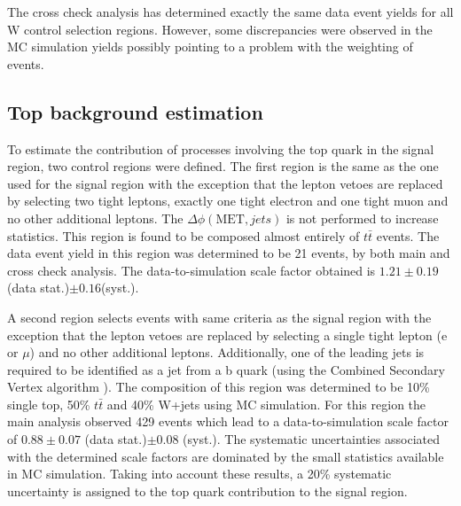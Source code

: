 The cross check analysis has determined exactly the same data event yields for all W control selection regions. However, some discrepancies were observed in the \gls{MC} simulation yields possibly pointing to a problem with the weighting of events.

\clearpage

\subsection{Top background estimation}
\label{SECTION:ParkedDataAnalysis_ControlRegions_TopBackground}


To estimate the contribution of processes involving the top quark in the signal region, two control regions were defined. The first region is the same as the one used for the signal region with the exception that the lepton vetoes are replaced by selecting two tight leptons, exactly one tight electron and one tight muon and no other additional leptons. The $\Delta\phi(\text{MET},jets)$ is not performed to increase statistics.  This region is found to be composed almost entirely of $t\bar{t}$ events. The data event yield in this region was determined to be 21 events, by both main and cross check analysis. The data-to-simulation scale factor obtained is $1.21\pm 0.19$ (data stat.)$ \pm 0.16 $(syst.).

A second region selects events with same criteria as the signal region with the exception that the lepton vetoes are replaced by selecting a single tight lepton (e or $\mu$) and no other additional leptons. Additionally, one of the leading jets is required to be identified as a jet from a b quark (using the Combined Secondary Vertex algorithm \cite{ARTICLE:CMSIdentificationOfbQuarks}). The composition of this region was determined to be 10\% single top, 50\% $t\bar{t}$ and 40\% W+jets using \gls{MC} simulation. For this region the main analysis observed 429 events which lead to a data-to-simulation scale factor of $0.88\pm 0.07$ (data stat.)$ \pm 0.08$ (syst.). The systematic uncertainties associated with the determined scale factors are dominated by the small statistics available in \gls{MC} simulation. Taking into account these results, a 20\% systematic uncertainty is assigned to the top quark contribution to the signal region. 

